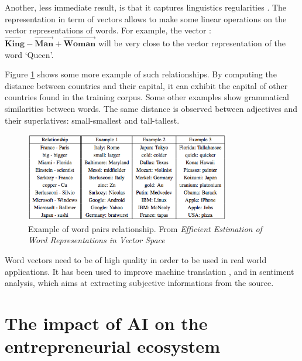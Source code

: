 \documentclass[12pt]{article}
\begin{document}
Another, less immediate result, is that it captures linguistics regularities
\cite{continuousWordVec}. The representation in term of vectors allows to make
some linear operations on the vector representations of words. For example,
the vector : $\vec{\textbf{King}} - \vec{\textbf{Man}} + \vec{\textbf{Woman}}$ will be very close to the vector
representation of the word \lq Queen\rq.

Figure \ref{fig:wordpair} shows some more example of such relationships. By
computing  the distance between countries and their capital, it can exhibit the
capital of other countries found in the training corpus. Some other examples
show grammatical similarities between words. The same distance is observed
between adjectives and their superlatives: small-smallest and tall-tallest.


\begin{figure}[ht]
    \centering
    \includegraphics[width=0.8\textwidth]{vectors}
    \caption{Example of word pairs relationship. From {\em Efficient Estimation of Word Representations in
    Vector Space} \cite{wordVec}}
    \label{fig:wordpair}
\end{figure}

Word vectors need to be of high quality in order to be used in real world applications.
It has been used to improve machine translation \cite{translation}, and in sentiment analysis, which aims
at extracting subjective informations from the source.\cite{sentiment}


\pagebreak



\section{The impact of AI on the entrepreneurial ecosystem}
\end{document}

